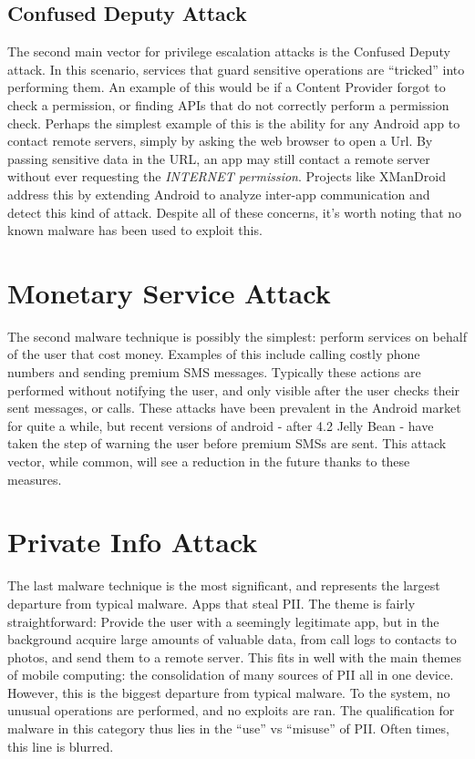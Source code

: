 \subsection{Confused Deputy Attack}
The second main vector for privilege escalation attacks is the Confused Deputy attack\citep{hardy1988confused}. In this scenario, services that guard sensitive operations are ``tricked'' into performing them. An example of this would be if a Content Provider forgot to check a permission, or finding APIs that do not correctly perform a permission check. Perhaps the simplest example of this is the ability for any Android app to contact remote servers, simply by asking the web browser to open a Url. By passing sensitive data in the URL, an app may still contact a remote server without ever requesting the \textit{INTERNET permission}. Projects like XManDroid\citep{bugiel2011xmandroid} address this by extending Android to analyze inter-app communication and detect this kind of attack. Despite all of these concerns, it's worth noting that no known malware has been used to exploit this. 

\section{Monetary Service Attack}
The second malware technique is possibly the simplest: perform services on behalf of the user that cost money. Examples of this include calling costly phone numbers and sending premium SMS messages. Typically these actions are performed without notifying the user, and only visible after the user checks their sent messages, or calls. These attacks have been prevalent in the Android market for quite a while, but recent versions of android - after 4.2 Jelly Bean - have taken the step of warning the user before premium SMSs are sent. This attack vector, while common, will see a reduction in the future thanks to these measures.



\section{Private Info Attack}
The last malware technique is the most significant, and represents the largest departure from typical malware. Apps that steal PII. The theme is fairly straightforward: Provide the user with a seemingly legitimate app, but in the background acquire large amounts of valuable data, from call logs to contacts to photos, and send them to a remote server. This fits in well with the main themes of mobile computing: the consolidation of many sources of PII all in one device. However, this is the biggest departure from typical malware. To the system, no unusual operations are performed, and no exploits are ran. The qualification for malware in this category thus lies in the ``use'' vs ``misuse'' of PII. Often times, this line is blurred.

